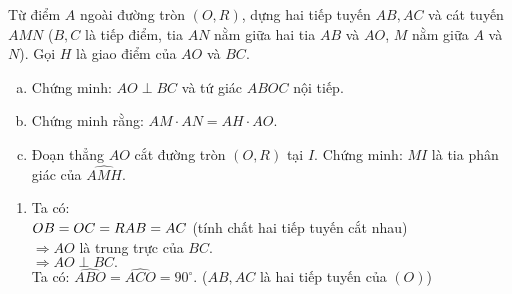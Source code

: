 \begin{ex}%
		Từ điểm $A$ ngoài đường tròn $(O,R)$, dựng hai tiếp tuyến $AB,AC$ và cát tuyến $AMN$ ($B,C$ là tiếp điểm, tia $AN$ nằm giữa hai tia $AB$ và $AO$, $M$ nằm giữa $A$ và $N$). Gọi $H$ là giao điểm của $AO$ và $BC$.
		\begin{enumerate}[a)]
			\item Chứng minh: $AO\perp BC$ và tứ giác $ABOC$ nội tiếp.
			\item Chứng minh rằng: $AM\cdot{AN}=AH\cdot{AO}.$
			\item Đoạn thẳng $AO$ cắt đường tròn $(O,R)$ tại $I$. Chứng minh: $MI$ là tia phân giác của $\widehat{AMH}.$ 
		\end{enumerate}
		\loigiai
		{
			\begin{center}
			\end{center}
		\begin{enumerate}
			\item Ta có:\\
					$OB=OC=R\\
					AB=AC$ (tính chất hai tiếp tuyến cắt nhau)\\
					$\Rightarrow AO$ là trung trực của $BC$.\\
					$\Rightarrow AO\perp BC.$\\
					Ta có: $\widehat {ABO}=\widehat {ACO}=90^{\circ}.$ ($AB, AC$ là hai tiếp tuyến của $(O)$)\\

\end{enumerate}}
\end{ex}
